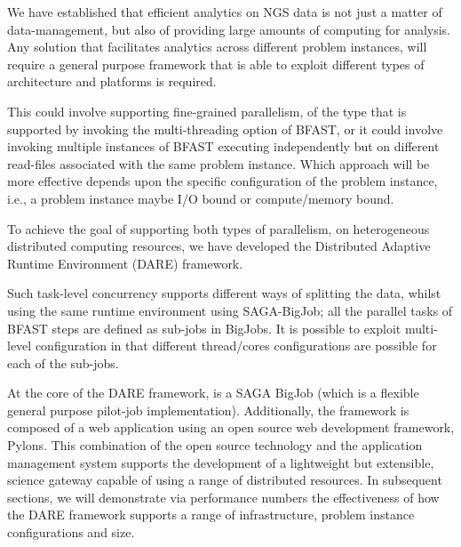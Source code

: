 \documentclass{acm_proc_article-sp}
\begin{document}
We have established that efficient analytics on NGS data is not just a
matter of data-management, but also of providing large amounts of
computing for analysis. Any solution that facilitates analytics across
different problem instances, will require a general purpose framework
that is able to exploit different types of architecture and platforms
is required.

 
This could involve supporting fine-grained parallelism, of the type
that is supported by invoking the multi-threading option of BFAST, or
it could involve invoking multiple instances of BFAST executing
independently but on different read-files associated with the same
problem instance. Which approach will be more effective depends upon
the specific configuration of the problem instance, i.e., a problem
instance maybe I/O bound or compute/memory bound.

To achieve the goal of supporting both types of parallelism, on
heterogeneous distributed computing resources, we have developed the
Distributed Adaptive Runtime Environment (DARE)
framework\cite{dareurl}.  

Such task-level concurrency supports different ways of splitting the
data, whilst using the same runtime environment using SAGA-BigJob; all
the parallel tasks of BFAST steps are defined as sub-jobs in BigJobs.
It is possible to exploit multi-level configuration in that different
thread/cores configurations are possible for each of the sub-jobs.

At the core of the DARE framework, is a SAGA BigJob (which is a
flexible general purpose pilot-job
implementation)\cite{saga-ccgrid10,saga-royalsoc,saga-web,jha2009developing,ecmls10}.
Additionally, the framework is composed of a web application using an
open source web development framework, Pylons\cite{pylonsurl}.  This
combination of the open source technology and the application
management system supports the development of a lightweight but
extensible, science gateway capable of using a range of distributed
resources.  In subsequent sections, we will demonstrate via
performance numbers the effectiveness of how the DARE framework
supports a range of infrastructure, problem instance configurations
and size.
\end{document}

